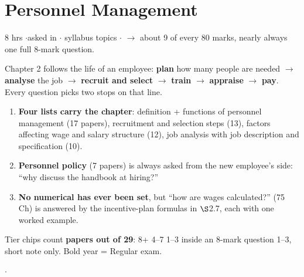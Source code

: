 \section{Personnel Management}
{\color{sub}\footnotesize 8 hrs \gap$\cdot$\gap asked in 
\gap$\cdot$ syllabus topics \gap$\cdot$\gap {}
$\rightarrow$ about 9 of every 80 marks, nearly always one full 8-mark question.}

\vspace{3pt}\noindent
\colorbox{gdL}{\makebox[\dimexpr\textwidth-2\fboxsep][l]{%
  \textcolor{gd}{\bfseries\footnotesize READ THIS FIRST}}}
\par\nobreak\vspace{3pt}

Chapter 2 follows the life of an employee: \textbf{plan} how many people are needed
$\rightarrow$ \textbf{analyse} the job $\rightarrow$ \textbf{recruit and select}
$\rightarrow$ \textbf{train} $\rightarrow$ \textbf{appraise} $\rightarrow$ \textbf{pay}.
Every question picks two stops on that line.
\begin{enumerate}[label=\arabic*., leftmargin=1.4em, itemsep=1pt]
  \item \textbf{Four lists carry the chapter}: definition + functions of personnel management
    (17 papers), recruitment and selection steps (13), factors affecting wage and salary
    structure (12), job analysis with job description and specification (10).
  \item \textbf{Personnel policy} (7 papers) is always asked from the new employee's side:
    ``why discuss the handbook at hiring?''
  \item \textbf{No numerical has ever been set}, but ``how are wages calculated?'' (75 Ch) is
    answered by the incentive-plan formulas in $\S$2.7, each with one worked example.
\end{enumerate}
Tier chips count \textbf{papers out of 29}:  8+ \gap {} 4--7 \gap {} 1--3
inside an 8-mark question \gap {} 1--3, short note only. Bold year = Regular exam.

\hr


{\color{sub}\footnotesize {}  \gap$\cdot$\gap {}}

